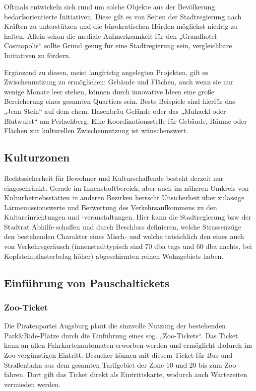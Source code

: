 \documentclass[a5paper, ngerman, 10pt]{scrbook}
\begin{document}
   Oftmals entwickeln sich rund um solche Objekte aus der Bevölkerung 
   bedarfsorientierte Initiativen. Diese gilt es von Seiten der Stadtregierung 
   nach Kräften zu unterstützen und die bürokratischen Hürden möglichst 
   niedrig zu halten. Allein schon die mediale Aufmerksamkeit für den 
   „Grandhotel Cosmopolis“ sollte Grund genug für eine Stadtregierung sein, 
   vergleichbare Initiativen zu fördern.
   
   Ergänzend zu diesen, meist langfristig angelegten Projekten, gilt es 
   Zwischennutzung zu ermöglichen: Gebäude und Flächen, auch wenn sie nur 
   wenige Monate leer stehen, können durch innovative Ideen eine große 
   Bereicherung eines gesamten Quartiers sein. Beste Beispiele sind hierfür 
   das „Jean Stein“ auf dem ehem. Hasenbräu-Gelände oder das „Muhackl oder 
   Blutwurst“ am Perlachberg. Eine Koordinationsstelle für Gebäude, Räume oder 
   Flächen zur kulturellen Zwischennutzung ist wünschenswert.
   
   \subsection{Kulturzonen}
   
   Rechtssicherheit für Bewohner und Kulturschaffende besteht derzeit nur 
   eingeschränkt. Gerade im Innenstadtbereich, aber auch im näheren Umkreis 
   von Kulturbetriebsstätten in anderen Bezirken herrscht Unsicherheit über 
   zulässige Lärmemissionswerte und Berwertung des Verkehrsaufkommens zu den 
   Kultureinrichtungen und -veranstaltungen. Hier kann die Stadtregierung bzw 
   der Stadtrat Abhilfe schaffen und durch Beschluss definieren, welche 
   Strassenzüge den bestehenden Charakter eines Misch- und welche tatsächlich 
   den eines auch von Verkehrsgeräusch (innenstadttypisch sind 70 dba tags und 
   60 dba nachts, bei Kopfsteinpflasterbelag höher) abgeschirmten reinen 
   Wohngebiets haben.
   
   \subsection{Einführung von Pauschaltickets}
   
   \subsubsection{Zoo-Ticket}
   
   Die Piratenpartei Augsburg plant die sinnvolle Nutzung der bestehenden 
   Park\&Ride-Plätze durch die Einführung eines sog. „Zoo-Tickets“. Das Ticket 
   kann an allen Fahrkartenautomaten erworben werden und ermöglicht dadurch im 
   Zoo vergünstigen Eintritt. Besucher können mit diesem Ticket für Bus und 
   Straßenbahn aus dem gesamten Tarifgebiet der Zone 10 und 20 bis zum Zoo 
   fahren. Dort gilt das Ticket direkt als Eintrittskarte, wodurch auch 
   Wartezeiten vermieden werden.
   
\end{document}
